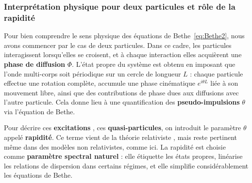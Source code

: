 \begin{figure}[H]
	\centering
  \label{}	
\end{figure}

\subsubsection{Interprétation physique pour deux particules et rôle de la rapidité}

Pour bien comprendre le sens physique des équations de Bethe~\eqref{eq:Bethe2}, nous avons commencer par le cas de deux particules. Dans ce cadre, les particules interagissent lorsqu'elles se croisent, et à chaque interaction elles acquièrent une {\bf phase de diffusion} $\Phi$. L’état propre du système est obtenu en imposant que l’onde multi-corps soit périodique sur un cercle de longueur $L$ : chaque particule effectue une rotation complète, accumule une phase cinématique $e^{i\theta L}$ liée à son mouvement libre, ainsi que des contributions de phase dues aux diffusions avec l’autre particule. Cela donne lieu à une quantification des {\bf pseudo-impulsions} $\theta$ via l’équation de Bethe.

\medskip

Pour décrire ces {\bf excitations} , ces {\bf quasi-particules}, on introduit le paramètre $\theta$ appelé {\bf rapidité}. Ce terme vient de la théorie relativiste \cite{ZAMOLODCHIKOV1979253,Babelon2003}, mais reste pertinent même dans des modèles non relativistes, comme ici. La rapidité est choisie comme {\bf paramètre spectral naturel} : elle étiquette les états propres, linéarise les relations de dispersion dans certains régimes, et elle simplifie considérablement les équations de Bethe.

\medskip

